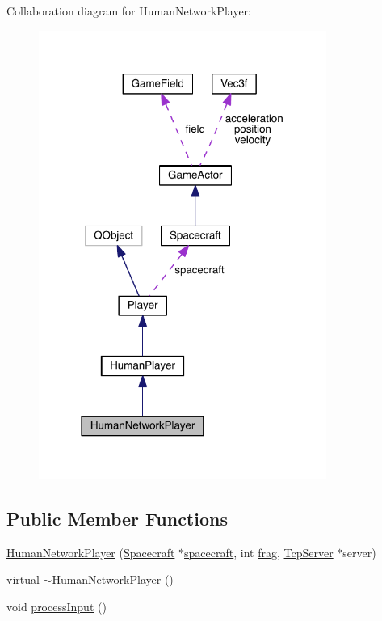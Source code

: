 Collaboration diagram for Human\+Network\+Player\+:\nopagebreak
\begin{figure}[H]
\begin{center}
\leavevmode
\includegraphics[width=267pt]{class_human_network_player__coll__graph}
\end{center}
\end{figure}
\subsection*{Public Member Functions}
\begin{DoxyCompactItemize}
\item 
\hyperlink{class_human_network_player_a2d77b83c604f55e401e32f5cb3c8023a}{Human\+Network\+Player} (\hyperlink{class_spacecraft}{Spacecraft} $\ast$\hyperlink{class_player_a7cc88a054d2329b1ca7472a86b2030ca}{spacecraft}, int \hyperlink{class_player_a9528a6db252f2fe947fd7d9189837aec}{frag}, \hyperlink{class_tcp_server}{Tcp\+Server} $\ast$server)
\item 
virtual \hyperlink{class_human_network_player_ab8d3f49f7ab1c7157efdd0b949a52045}{$\sim$\+Human\+Network\+Player} ()
\item 
void \hyperlink{class_human_network_player_a3914e46fec4bd007fff44ec984599d94}{process\+Input} ()
\end{DoxyCompactItemize}

